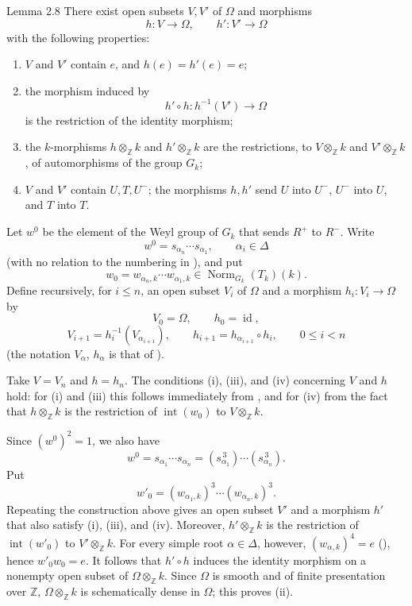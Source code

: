 \begin{sgastatement}{Lemma 2.8}
There exist open subsets \(V,V'\) of \(\Omega\) and morphisms
\[
 h\colon V\longrightarrow\Omega,\qquad
 h'\colon V'\longrightarrow\Omega
\]
with the following properties:
\begin{enumerate}[label=\textup{(\roman*)},leftmargin=2.2em]
\item \(V\) and \(V'\) contain \(e\), and \(h(e)=h'(e)=e\);
\item{} the morphism induced by
\[
 h'\circ h\colon h^{-1}(V')\longrightarrow\Omega
\]
is the restriction of the identity morphism;
\item{} the \(k\)-morphisms \(h\otimes_{\mathbb Z}k\) and
\(h'\otimes_{\mathbb Z}k\) are the restrictions, to
\(V\otimes_{\mathbb Z}k\) and \(V'\otimes_{\mathbb Z}k\), of
automorphisms of the group \(G_k\);
\item{} \(V\) and \(V'\) contain \(U,T,U^-\); the morphisms \(h,h'\)
send \(U\) into \(U^-\), \(U^-\) into \(U\), and \(T\) into \(T\).
\end{enumerate}
\end{sgastatement}

Let \(w^0\) be the element of the Weyl group of \(G_k\) that sends \(R^+\)
to \(R^-\). Write
\[
 w^0=s_{\alpha_n}\cdots s_{\alpha_1},\qquad \alpha_i\in\Delta
\]
(with no relation to the numbering in ), and put
\[
 w_0=w_{\alpha_n,k}\cdots w_{\alpha_1,k}
 \in\operatorname{Norm}_{G_k}(T_k)(k).
\]
Define recursively, for \(i\leq n\), an open subset \(V_i\) of \(\Omega\)
and a morphism \(h_i\colon V_i\to\Omega\) by
\[
 V_0=\Omega,\qquad h_0=\operatorname{id},
\]
\[
 V_{i+1}=h_i^{-1}(V_{\alpha_{i+1}}),\qquad
 h_{i+1}=h_{\alpha_{i+1}}\circ h_i,\qquad 0\leq i<n
\]
(the notation \(V_\alpha\), \(h_\alpha\) is that of ).

Take \(V=V_n\) and \(h=h_n\). The conditions (i), (iii), and (iv) concerning
\(V\) and \(h\) hold: for (i) and (iii) this follows immediately from
, and for (iv) from the fact that \(h\otimes_{\mathbb Z}k\) is the
restriction of \(\operatorname{int}(w_0)\) to
\(V\otimes_{\mathbb Z}k\).

Since \((w^0)^2=1\), we also have
\[
 w^0=s_{\alpha_1}\cdots s_{\alpha_n}
 =(s_{\alpha_1}^{\,3})\cdots(s_{\alpha_n}^{\,3}).
\]
Put
\[
 w'_0=(w_{\alpha_1,k})^3\cdots(w_{\alpha_n,k})^3.
\]
Repeating the construction above gives an open subset \(V'\) and a
morphism \(h'\) that also satisfy (i), (iii), and (iv). Moreover,
\(h'\otimes_{\mathbb Z}k\) is the restriction of
\(\operatorname{int}(w'_0)\) to \(V'\otimes_{\mathbb Z}k\). For every
simple root \(\alpha\in\Delta\), however,
\((w_{\alpha,k})^4=e\) (), hence \(w'_0w_0=e\).
It follows that \(h'\circ h\) induces the identity morphism on a nonempty
open subset of \(\Omega\otimes_{\mathbb Z}k\). Since \(\Omega\) is smooth
and of finite presentation over \(\mathbb Z\),
\(\Omega\otimes_{\mathbb Z}k\) is schematically dense in \(\Omega\);
this proves (ii).

